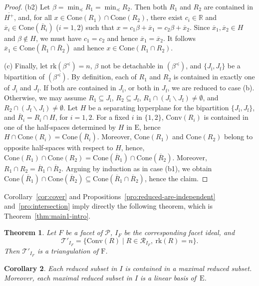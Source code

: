 \documentclass[10pt]{amsart}
\newtheorem{thm}{Theorem}[section]
\newtheorem{cor}[thm]{Corollary}
\theoremstyle{definition}
\theoremstyle{remark}
\newcommand\nl{\par\noindent}
\newcommand\ov{\overline}
\newcommand\mc{\mathcal}
\newcommand\smeno{\smallsetminus}
\newcommand\real{\mathbb R}
\newcommand\pol{\mathcal P}
\newcommand\conv{\mathrm{Conv}}
\newcommand\cone{\mathrm{Cone}}
\newcommand\rk{\mathrm{rk}}
\newcommand\be{\beta}
\newcommand\preq{\preccurlyeq}
\begin{document}
\begin{proof}
(b2) Let $\be=\min_\preq R_1=\min_\preq R_2$. 
Then both $R_1$ and $R_2$ are contained in $\ov {H^+}$, 
and, for all $x\in \cone(R_1)\cap\cone(R_2)$, there exist $c_i\in \real$ and $\ov x_i\in \cone(\ov R_i)$ ($i=1, 2$) such that  $x=c_1\be+\ov x_1=c_2\be +\ov x_2$.
Since $\ov x_1, \ov x_2\in H$ and $\be\not\in H$, we must have  $c_1=c_2$ and hence $\ov x_1=\ov x_2$. 
It follows  $\ov x_1\in \cone (\ov R_1\cap \ov R_2)$ and  hence $x\in \cone (R_1\cap R_2)$.

(c) Finally, let $\rk(\be^\preq)=n$, $\be$ not be detachable in  $(\be^\preq)$, and  $\{J_{\mathrm i}, J_{\mathrm f}\}$  be a bipartition of $(\be^\preq)$. 
By definition, each of $R_1$ and $R_2$ is contained in exactly one of $J_{\mathrm i}$ and $J_{\mathrm f}$. 
If both are contained in $J_{\mathrm i}$, or both in $J_{\mathrm f}$, we are reduced to case (b). 
Otherwise, we may assume $R_1\subseteq J_{\mathrm i}$, $R_2\subseteq J_{\mathrm f}$, $R_1\cap  (J_{\mathrm i}\smeno J_{\mathrm f})\neq \emptyset$, and $R_2\cap  (J_{\mathrm f}\smeno J_{\mathrm i})\neq \emptyset$. 
Let $H$ be a separating hyperplane for the bipartition $\{J_{\mathrm i}, J_{\mathrm f}\}$, and $\ov R_i=R_i\cap H$, for $i=1,2$. 
For a fixed $i$ in $\{1,2\}$, $\conv(R_i)$ is contained in one of the half-spaces determined by $H$ in $\mathrm E$, hence  $H\cap\cone(R_i)=\cone (\ov R_i)$. 
Moreover,  $\cone(R_1)$ and $\cone(R_2)$  belong to opposite half-spaces with respect to $H$, hence, $\cone(R_1)\cap \cone(R_2)=\cone (\ov R_1)\cap\cone( \ov R_2)$. 
Moreover, $R_1\cap R_2=\ov R_1\cap \ov R_2$.  
Arguing by induction as in case  (b1), we obtain $\cone (\ov R_1)\cap\cone( \ov R_2)\subseteq \cone (\ov R_1\cap \ov R_2)$, hence the claim.
\end{proof}

Corollary~\ref{cor:cover} and Propositions~\ref{pro:reduced-are-independent} and~\ref{pro:intersection} imply directly the following theorem, which is Theorem~\ref{thm:main1-intro}.

\begin{thm}\label{thm:main1}
Let $F$ be a facet of $\pol$, $I_F$ be the corresponding facet ideal, and 
$$
\mc T'_{I_F}=\{\conv(R) \mid R\in \mc R_{I_F},\ \rk(R)=n\}.
$$
Then $\mc T'_{I_F}$ is a triangulation of $\mathrm F$. 
\end{thm}

\begin{cor}
Each reduced subset in $I$ is  contained in a maximal reduced subset.
Moreover, each maximal reduced subset in $I$ is a linear basis of~$\mathrm E$. 
\end{cor}
\end{document}

